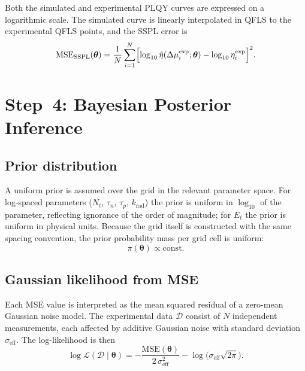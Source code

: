 \documentclass[a4paper,11pt]{article}
\newcommand{\btheta}{\boldsymbol{\theta}}
\newcommand{\MSE}{\mathrm{MSE}}
\newcommand{\SSPL}{\mathrm{SSPL}}
\newcommand{\effNN}{\mathrm{eff}}
\newcommand{\logten}{\log_{10}}
\begin{document}
Both the simulated and experimental PLQY curves are expressed on a logarithmic
scale.  The simulated curve is linearly interpolated in QFLS to the
experimental QFLS points, and the SSPL error is
\begin{equation}
  \MSE_\SSPL(\btheta)
  = \frac{1}{N}\sum_{i=1}^{N}
    \Bigl[\logten\hat{\eta}(\Delta\mu_i^\mathrm{exp};\btheta)
          - \logten\eta_i^\mathrm{exp}\Bigr]^2.
  \label{eq:mse_sspl}
\end{equation}

\section{Step~4: Bayesian Posterior Inference}

\subsection{Prior distribution}

A uniform prior is assumed over the grid in the relevant parameter space.
For log-spaced parameters ($N_t$, $\tau_n$, $\tau_p$, $k_\mathrm{rad}$) the
prior is uniform in $\logten$ of the parameter, reflecting ignorance of the
order of magnitude; for $E_t$ the prior is uniform in physical units.
Because the grid itself is constructed with the same spacing convention, the
prior probability mass per grid cell is uniform:
\begin{equation}
  \pi(\btheta) \propto \mathrm{const.}
\end{equation}

\subsection{Gaussian likelihood from MSE}

Each MSE value is interpreted as the mean squared residual of a
zero-mean Gaussian noise model.  The experimental data $\mathcal{D}$ consist
of $N$ independent measurements, each affected by additive Gaussian noise
with standard deviation $\sigma_\effNN$.  The log-likelihood is then
\begin{equation}
  \log\mathcal{L}(\mathcal{D}\mid\btheta)
  = -\frac{\MSE(\btheta)}{2\,\sigma_\effNN^2}
    - \log\!\bigl(\sigma_\effNN\sqrt{2\pi}\bigr).
  \label{eq:loglik}
\end{equation}
\end{document}
